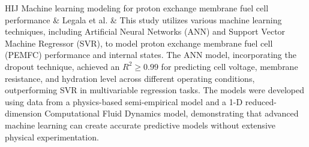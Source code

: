 \begin{table}[H]
\begin{tabularx}{\textwidth}{HIJ}
    \midrule
    Machine learning modeling for proton exchange membrane fuel cell performance & Legala et al. & This study utilizes various machine learning techniques, including Artificial Neural Networks (ANN) and Support Vector Machine Regressor (SVR), to model proton exchange membrane fuel cell (PEMFC) performance and internal states. The ANN model, incorporating the dropout technique, achieved an \(R^2 \geq 0.99\) for predicting cell voltage, membrane resistance, and hydration level across different operating conditions, outperforming SVR in multivariable regression tasks. The models were developed using data from a physics-based semi-empirical model and a 1-D reduced-dimension Computational Fluid Dynamics model, demonstrating that advanced machine learning can create accurate predictive models without extensive physical experimentation. \\
    \midrule 
     \\
    \bottomrule
    \end{tabularx}
    \end{table}

